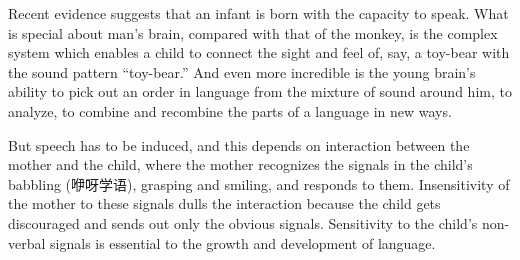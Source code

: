 \documentclass[a4paper]{article}
\begin{document}
\par
Recent evidence suggests that an infant is born with the capacity to speak. What is special about man’s brain, compared with that of the monkey, is the complex system which enables a child to connect the sight and feel of, say, a toy-bear with the sound pattern “toy-bear.” And even more incredible is the young brain’s ability to pick out an order in language from the mixture of sound around him, to analyze, to combine and recombine the parts of a language in new ways.

\par
But speech has to be induced, and this depends on interaction between the mother and the child, where the mother recognizes the signals in the child’s babbling (咿呀学语), grasping and smiling, and responds to them. Insensitivity of the mother to these signals dulls the interaction because the child gets discouraged and sends out only the obvious signals. Sensitivity to the child’s non-verbal signals is essential to the growth and development of language.
\end{document}
